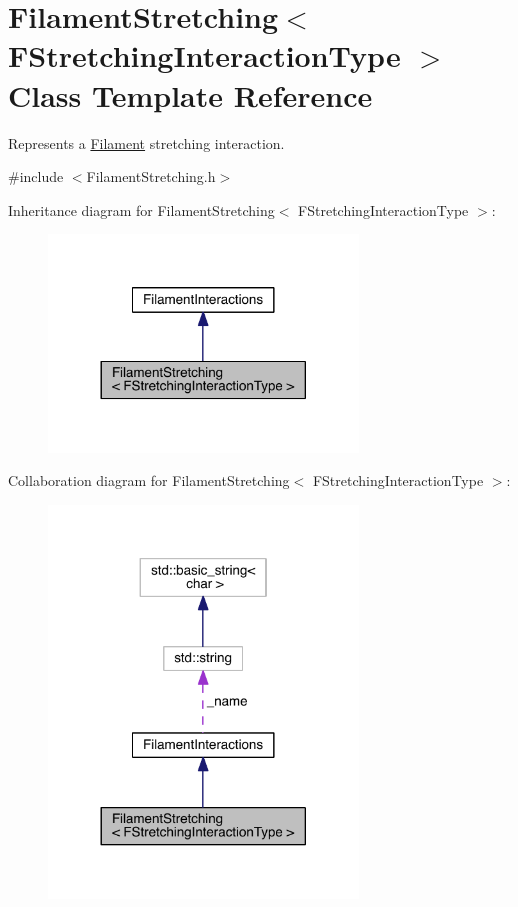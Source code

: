 \hypertarget{classFilamentStretching}{\section{Filament\+Stretching$<$ F\+Stretching\+Interaction\+Type $>$ Class Template Reference}
\label{classFilamentStretching}
}


Represents a \hyperlink{classFilament}{Filament} stretching interaction.  




{\ttfamily \#include $<$Filament\+Stretching.\+h$>$}



Inheritance diagram for Filament\+Stretching$<$ F\+Stretching\+Interaction\+Type $>$\+:
\nopagebreak
\begin{figure}[H]
\begin{center}
\leavevmode
\includegraphics[width=233pt]{classFilamentStretching__inherit__graph}
\end{center}
\end{figure}


Collaboration diagram for Filament\+Stretching$<$ F\+Stretching\+Interaction\+Type $>$\+:
\nopagebreak
\begin{figure}[H]
\begin{center}
\leavevmode
\includegraphics[width=233pt]{classFilamentStretching__coll__graph}
\end{center}
\end{figure}
